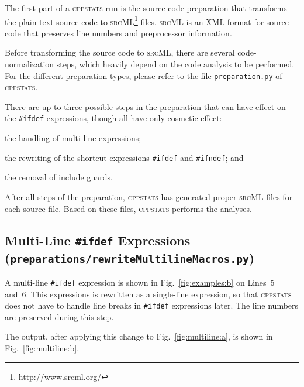\documentclass[a4paper]{scrartcl}
\newcommand\code[1]{\texttt{#1}}
\newcommand\tool[1]{\textsc{#1}}
\newcommand\ifdeff[1]{\code{\##1}\xspace}
\newcommand\ifdef[0]{{\upshape\ifdeff{ifdef}}\xspace}
\newcommand\cppstats[0]{\tool{cppstats}\xspace}
\begin{document}
The first part of a \cppstats run is the source-code preparation that transforms the plain-text source code to \tool{srcML}\footnote{http://www.srcml.org/} files.
\tool{srcML} is an XML format for source code that preserves line numbers and preprocessor information.

Before transforming the source code to \tool{srcML}, there are several code-normalization steps, which heavily depend on the code analysis to be performed.
For the different preparation types, please refer to the file \code{preparation.py} of \cppstats.

There are up to three possible steps in the preparation that can have effect on the \ifdef expressions, though all have only cosmetic effect:
\begin{inparaenum}[\itshape 1\upshape)]
\item the handling of multi-line expressions;
\item the rewriting of the shortcut expressions \ifdeff{ifdef} and \ifdeff{ifndef}; and
\item the removal of include guards.
\end{inparaenum}

After all steps of the preparation, \cppstats has generated proper \tool{srcML} files for each source file.
Based on these files, \cppstats performs the analyses.


\subsection{Multi-Line \ifdef Expressions {\footnotesize (\code{preparations/rewriteMultilineMacros.py})}}

A multi-line \ifdef expression is shown in Fig.\ \ref{fig:examples:b} on Lines~5 and~6.
This expressions is rewritten as a single-line expression, so that \cppstats does not have to handle line breaks in \ifdef expressions later.
The line numbers are preserved during this step.

The output, after applying this change to Fig.\ \ref{fig:multiline:a}, is shown in Fig.\ \ref{fig:multiline:b}.
\end{document}
